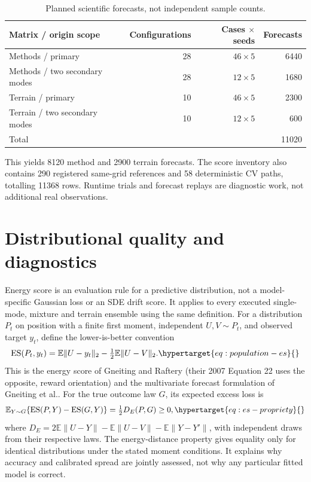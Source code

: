 \begin{table}[htbp]
\centering\small
\caption{Planned scientific forecasts, not independent sample counts.}
\label{tab:forecast-counts}\hypertarget{tab:forecast-counts}{}
\begin{tabular}{@{}lrrr@{}}
\toprule
Matrix / origin scope & Configurations & Cases $\times$ seeds & Forecasts\\
\midrule
Methods / primary & 28 & $46\times5$ & 6440\\
Methods / two secondary modes & 28 & $12\times5$ & 1680\\
Terrain / primary & 10 & $46\times5$ & 2300\\
Terrain / two secondary modes & 10 & $12\times5$ & 600\\
\midrule
Total & & & 11020\\
\bottomrule
\end{tabular}
\end{table}

This yields 8120 method and 2900 terrain forecasts. The score inventory also
contains 290 registered same-grid references and 58 deterministic CV
paths, totalling 11368 rows. Runtime trials and forecast replays are diagnostic
work, not additional real observations.

\label{sec:inference}\hypertarget{sec:inference}{}

\section{Distributional quality and diagnostics}
Energy score is an evaluation rule for a predictive distribution, not a
model-specific Gaussian loss or an SDE drift score. It applies to every
executed single-mode, mixture and terrain ensemble using the same definition.
For a distribution \(P_t\) on position with a finite first moment,
independent \(U,V\sim P_t\), and observed target \(y_t\), define the
lower-is-better convention
\begin{equation}
 \ES(P_t,y_t)=\mathbb E\|U-y_t\|_2-\tfrac12\mathbb E\|U-V\|_2 .
 \label{eq:population-es}\hypertarget{eq:population-es}{}
\end{equation}
This is the energy score of Gneiting and Raftery (their 2007
Equation 22 uses the opposite, reward orientation) and the multivariate
forecast formulation of Gneiting et al.\cite{gneiting2007,gneiting2008}.
For the true outcome law \(G\), its expected excess loss is
\begin{equation}
 \mathbb E_{Y\sim G}\{\ES(P,Y)-\ES(G,Y)\}
 =\tfrac12 D_E(P,G)\geq0 ,
 \label{eq:es-propriety}\hypertarget{eq:es-propriety}{}
\end{equation}
where \(D_E=2\mathbb E\|U-Y\|-\mathbb E\|U-V\|-\mathbb E\|Y-Y'\|\),
with independent draws from their respective laws. The energy-distance
property gives equality only for identical distributions under the stated
moment conditions. It explains why accuracy and calibrated spread are
jointly assessed, not why any particular fitted model is correct.

